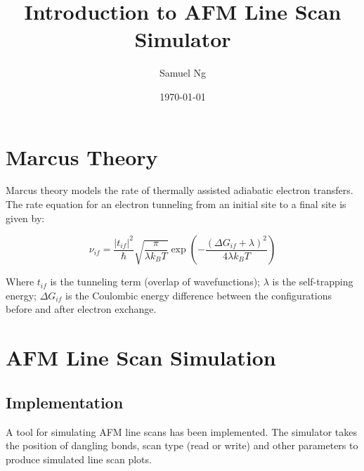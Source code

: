 \documentclass{article}
\title{Introduction to AFM Line Scan Simulator}
\date{\today}
\author{Samuel Ng}
\begin{document}
\makeatletter
\begin{center}
  \Large
  \textbf{\@title}
  \par
  \@author
\end{center}
\makeatother


\section{Marcus Theory} \label{sec:introduction}




Marcus theory models the rate of thermally assisted adiabatic electron transfers. The rate equation for an electron tunneling from an initial site to a final site is given by:

\begin{equation}
  \nu_{i f} = \frac{|t_{i f}|^{2}}{\hbar} \sqrt{\frac{\pi}{\lambda k_{B} T}} \exp \left(- \frac{(\Delta G_{i f} + \lambda)^{2}}{4 \lambda k_{B} T} \right)
  \label{eq:marcus-tunneling-rate}
\end{equation}

Where $t_{i f}$ is the tunneling term (overlap of wavefunctions); $\lambda$ is the self-trapping energy; $\Delta G_{i f}$ is the Coulombic energy difference between the configurations before and after electron exchange. 




\section{AFM Line Scan Simulation} \label{sec:simulation}


\subsection{Implementation}

A tool for simulating AFM line scans has been implemented. The simulator takes the position of dangling bonds, scan type (read or write) and other parameters to produce simulated line scan plots.
\end{document}
